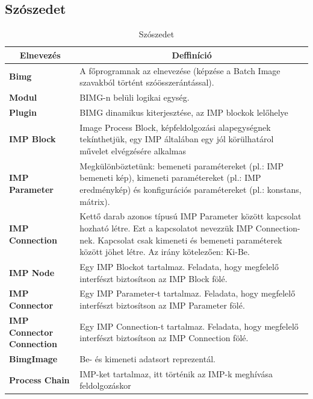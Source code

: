 \documentclass[a4paper,12pt,oneside]{report}
\begin{document}
\begin{table}[h]
\subsection{Szószedet}
\begin{tabular}{p{3cm}|p{10cm}}

\toprule
\multicolumn{1}{c}{\textbf{Elnevezés}} & \multicolumn{1}{c}{\textbf{Deffiníció}} \\ \midrule
\textbf{Bimg} & A főprogramnak az elnevezése (képzése a Batch Image szavakból történt szóösszerántással). \\
\hline
\textbf{Modul} & BIMG-n belüli logikai egység. \\
\hline
\textbf{Plugin} & BIMG dinamikus kiterjesztése, az IMP blockok lelőhelye \\
\hline
\textbf{IMP Block} & Image Process Block, képfeldolgozási alapegységnek tekínthetjük, egy IMP általában egy jól körülhatárol művelet elvégzésére alkalmas \\
\hline
\textbf{IMP Parameter} & Megkülönböztetünk: bemeneti paramétereket (pl.: IMP bemeneti kép), kimeneti paramétereket (pl.: IMP eredménykép) és konfigurációs paramétereket (pl.: konstans, mátrix). \\
\hline
\textbf{IMP Connection} & Kettő darab azonos típusú IMP Parameter között kapcsolat hozható létre. Ezt a kapcsolatot nevezzük IMP Connection-nek. Kapcsolat csak kimeneti és bemeneti paraméterek között jöhet létre. Az irány kötelezően: Ki-Be. \\
\hline
\textbf{IMP Node} & Egy IMP Blockot tartalmaz. Feladata, hogy megfelelő interfészt biztosítson az IMP Block fölé. \\
\hline
\textbf{IMP Connector} & Egy IMP Parameter-t tartalmaz. Feladata, hogy megfelelő interfészt biztosítson az IMP Parameter fölé. \\
\hline
\textbf{IMP Connector Connection} & Egy IMP Connection-t tartalmaz. Feladata, hogy megfelelő interfészt biztosítson az IMP Connection fölé. \\
\hline
\textbf{BimgImage} & Be- és kimeneti adatsort reprezentál. \\
\hline
\textbf{Process Chain} & IMP-ket tartalmaz, itt történik az IMP-k meghívása feldolgozáskor \\

\hline
\end{tabular}
\caption{Szószedet}
\label{table:szoszedet}
\end{table}
\end{document}
